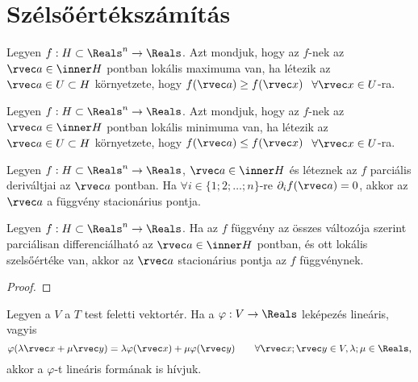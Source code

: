 \clearpage
\section{Szélsőértékszámítás}\label{sec-03-04}

\begin{definition}
  Legyen $f: H \subset \Reals^n \to \Reals$. Azt mondjuk, hogy az $f$-nek
  az $\rvec a \in \inner H$ pontban lokális maximuma van, ha létezik az
  $\rvec a \in U \subset H$ környetzete, hogy $f(\rvec a) \geq f(\rvec x)$
  $\;\forall \rvec x \in U$-ra.
\end{definition}

\begin{definition}
  Legyen $f: H \subset \Reals^n \to \Reals$. Azt mondjuk, hogy az $f$-nek
  az $\rvec a \in \inner H$ pontban lokális minimuma van, ha létezik az
  $\rvec a \in U \subset H$ környetzete, hogy $f(\rvec a) \leq f(\rvec x)$
  $\;\forall \rvec x \in U$-ra.
\end{definition}

\begin{definition}
  Legyen $f: H \subset \Reals^n \to \Reals$, $\rvec a \in \inner H$ és
  léteznek az $f$ parciális deriváltjai az $\rvec a$ pontban. Ha
  $\forall i \in \{1;2;\ldots;n\}$-re $\partial_i f(\rvec a) = 0$, akkor
  az $\rvec a$ a függvény stacionárius pontja.
\end{definition}

\begin{theorem}
  Legyen $f: H \subset \Reals^n \to \Reals$. Ha az $f$ függvény az összes
  változója szerint parciálisan differenciálható az $\rvec a \in \inner H$
  pontban, és ott lokális szelsőértéke van, akkor az $\rvec a$ stacionárius
  pontja az $f$ függvénynek.

  \begin{proof}
    \vspace{7em}
  \end{proof}
\end{theorem}

\begin{definition}
  Legyen a $V$ a $T$ test feletti vektortér. Ha a $\varphi: V \to \Reals$
  leképezés lineáris, vagyis
  $$
    \varphi(\lambda \rvec x + \mu \rvec y)
    = \lambda \varphi(\rvec x) + \mu \varphi(\rvec y)
    \qquad \forall \rvec x; \rvec y \in V, \lambda; \mu \in \Reals
    \text,
  $$
  akkor a $\varphi$-t lineáris formának is hívjuk.
\end{definition}

